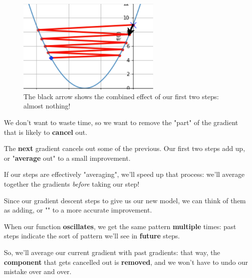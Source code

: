             \begin{figure}[H]
                \centering
                    \includegraphics[width=70mm,scale=0.5]{images/nn_2_images/oscillate_zoom.png}
                
                \caption*{The black arrow shows the combined effect of our first two steps: almost nothing!}
            \end{figure}
            
            We don't want to waste time, so we want to remove the "part" of the gradient that is likely to \textbf{cancel} out. 
            
            The \textbf{next} gradient cancels out some of the previous. Our first two steps add up, or "\textbf{average} out" to a small improvement.
            
            If our steps are effectively "averaging", we'll speed up that process: we'll average together the gradients \textit{before} taking our step!
                \\
                
            \begin{concept}
                Since our gradient descent steps  to give us our new model, we can think of them as adding, or "" to a more accurate improvement.
            \end{concept}
            
            
            When our function \textbf{oscillates}, we get the same pattern \textbf{multiple} times: past steps indicate the sort of pattern we'll see in \textbf{future} steps. 
            
            So, we'll average our current gradient with past gradients: that way, the \textbf{component} that gets cancelled out is \textbf{removed}, and we won't have to undo our mistake over and over.\\
            
